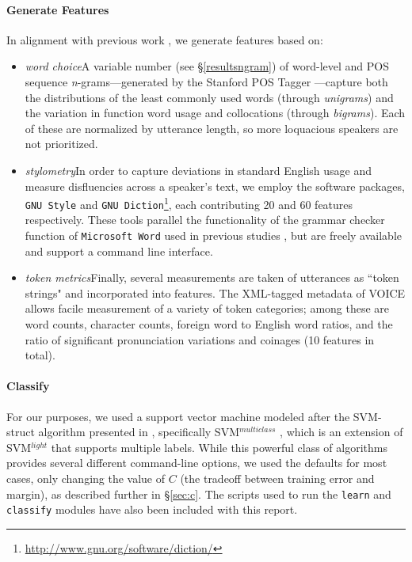 \documentclass[11pt]{article}
\begin{document}
\paragraph{Generate Features} In alignment with previous work \cite{Koppel2005a,Tsur2007,Brooke2012}, we generate features based on: 
\begin{itemize}
\item \emph{word choice}\hspace{1em}A variable number (see \S\ref{resultsngram}) of word-level and POS sequence \emph{n}-grams---generated by the Stanford POS Tagger \cite{POSTagger}---capture both the distributions of the least commonly used words (through \emph{unigrams}) and the variation in function word usage and collocations (through \emph{bigrams}). Each of these are normalized by utterance length, so more loquacious speakers are not prioritized.
\item \emph{stylometry}\hspace{1em}In order to capture deviations in standard English usage and measure disfluencies across a speaker's text, we employ the software packages, \texttt{GNU Style} and \texttt{GNU Diction}\footnote{\url{http://www.gnu.org/software/diction/}}, each contributing 20 and 60 features respectively. These tools parallel the functionality of the grammar checker function of \texttt{Microsoft Word} used in previous studies \cite{Koppel2005a}, but are freely available and support a command line interface.
\item \emph{token metrics}\hspace{1em}Finally, several measurements are taken of utterances as ``token strings" and incorporated into features. The XML-tagged metadata of VOICE allows facile measurement of a variety of token categories; among these are word counts, character counts, foreign word to English word ratios, and the ratio of significant pronunciation variations and coinages (10 features in total). 
\end{itemize}

\paragraph{Classify} For our purposes, we used a support vector machine modeled after the SVM-struct algorithm presented in \cite{svm-struct}, specifically SVM$^{multiclass}$ \cite{svm-multiclass-prog}, which is an extension of SVM$^{light}$ \cite{svm-light} that supports multiple labels.  While this powerful class of algorithms provides several different command-line options, we used the defaults for most cases, only changing the value of $C$ (the tradeoff between training error and margin), as described further in \S\ref{sec:c}.  The scripts used to run the {\tt learn} and {\tt classify} modules have also been included with this report.
\end{document}
